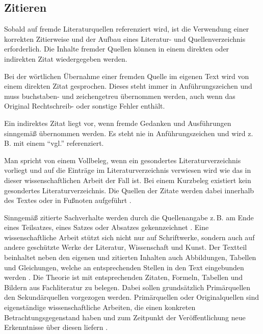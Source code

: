 \subsection{Zitieren}
Sobald auf fremde Literaturquellen referenziert wird, ist die Verwendung einer korrekten Zitierweise und der Aufbau eines Literatur- und Quellenverzeichnis erforderlich.
Die Inhalte fremder Quellen können in einem direkten oder indirekten Zitat wiedergegeben werden.

Bei der wörtlichen Übernahme einer fremden Quelle im eigenen Text wird von einem direkten Zitat gesprochen.
Dieses steht immer in Anführungszeichen und muss buchstaben- und zeichengetreu übernommen werden, auch wenn das Original Rechtschreib- oder sonstige Fehler enthält.

Ein indirektes Zitat liegt vor, wenn fremde Gedanken und Ausführungen sinngemäß übernommen werden.
Es steht nie in Anführungszeichen und wird z.\,B. mit einem "`vgl."' referenziert.

Man spricht von einem Vollbeleg, wenn ein gesondertes Literaturverzeichnis vorliegt und auf die Einträge im Literaturverzeichnis verwiesen wird wie das in dieser wissenschaftlichen Arbeit der Fall ist.
Bei einem Kurzbeleg existiert kein gesondertes Literaturverzeichnis.
Die Quellen der Zitate werden dabei innerhalb des Textes oder in Fußnoten aufgeführt \cite{Kipp2012}.

Sinngemäß zitierte Sachverhalte werden durch die Quellenangabe z.\,B. am Ende eines Teilsatzes, eines Satzes oder Absatzes gekennzeichnet \cite[S.~109~ff.]{Hering2009}.
Eine wissenschaftliche Arbeit stützt sich nicht nur auf Schriftwerke, sondern auch auf andere geschützte Werke der Literatur, Wissenschaft und Kunst.
Der Textteil beinhaltet neben den eigenen und zitierten Inhalten auch Abbildungen, Tabellen und Gleichungen, welche an entsprechenden Stellen in den Text eingebunden werden \cite[S.~196]{Balz2008}.
Die Theorie ist mit entsprechenden Zitaten, Formeln, Tabellen und Bildern aus Fachliteratur zu belegen.
Dabei sollen grundsätzlich Primärquellen den Sekundärquellen vorgezogen werden.
Primärquellen oder Originalquellen sind eigenständige wissenschaftliche Arbeiten, die einen konkreten Betrachtungsgegenstand haben und zum Zeitpunkt der Veröffentlichung neue Erkenntnisse über diesen liefern \cite[S.~81]{Balz2008}.

